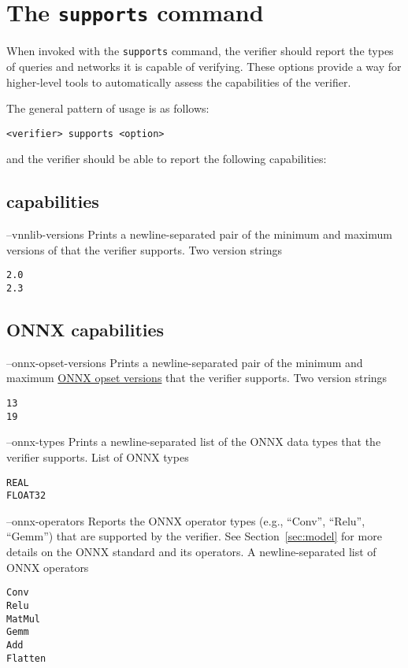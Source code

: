 \section{The \texttt{supports} command}
\label{sec:global_capabilities}

When invoked with the \texttt{supports} command, the verifier should report the types of queries and networks it is capable of verifying.
These options provide a way for higher-level tools to automatically assess the capabilities of the verifier.

The general pattern of usage is as follows:
\begin{lstlisting}[style=bash]
<verifier> supports <option>
\end{lstlisting}
and the verifier should be able to report the following capabilities:

\subsection{\vnnlib{} capabilities}

\clOutputOption
{--vnnlib-versions}
{Prints a newline-separated pair of the minimum and maximum versions of \vnnlib{} that the verifier supports.}
{Two version strings}
\begin{lstlisting}[style=bash]
%*\exampleVerifier* supports --vnnlib-versions
2.0
2.3
\end{lstlisting}

\subsection{ONNX capabilities}

\clOutputOption
{--onnx-opset-versions}
{Prints a newline-separated pair of the minimum and maximum \href{https://onnxruntime.ai/docs/reference/compatibility.html\#onnx-opset-support}{ONNX opset versions} that the verifier supports.}
{Two version strings}
\begin{lstlisting}[style=bash]
%*\exampleVerifier* supports --onnx-opset-versions
13
19
\end{lstlisting}

\clOutputOption
{--onnx-types}
{Prints a newline-separated list of the ONNX data types that the verifier supports.}
{List of ONNX types}
\begin{lstlisting}[style=bash]
%*\exampleVerifier* supports --onnx-types
REAL
FLOAT32
\end{lstlisting}

\clOutputOption
{--onnx-operators}
{Reports the ONNX operator types (e.g., ``Conv'', ``Relu'', ``Gemm'') that are supported by the verifier. See Section~\ref{sec:model} for more details on the ONNX standard and its operators.
}
{A newline-separated list of ONNX operators}
\begin{lstlisting}[style=bash]
%*\exampleVerifier* supports --onnx-operators
Conv
Relu
MatMul
Gemm
Add
Flatten
\end{lstlisting}

